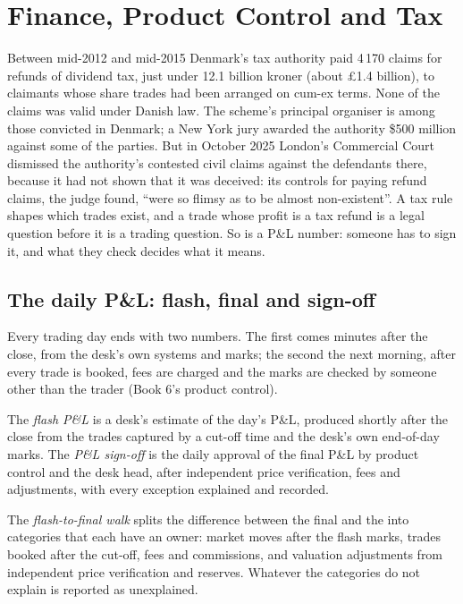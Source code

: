 \chapter{Finance, Product Control and Tax}\label{ch:fm:finance-product-control-and-tax}

Between mid-2012 and mid-2015 Denmark's tax authority paid 4\,170 claims for refunds of dividend tax, just under 12.1 billion kroner (about
\pounds1.4 billion), to claimants whose share trades had been arranged on cum-ex terms. None of the claims was valid under Danish law. The scheme's
principal organiser is among those convicted in Denmark; a New York jury awarded the authority \$500 million against some of the parties. But in
October 2025 London's Commercial Court dismissed the authority's contested civil claims against the defendants there, because it had not shown that it was
deceived: its controls for paying refund claims, the judge found, ``were so flimsy as to be almost non-existent''. A tax rule shapes which trades
exist, and a trade whose profit is a tax refund is a legal question before it is a trading question. So is a P\&L number: someone has to sign it,
and what they check decides what it means.

\section{The daily P\&L: flash, final and sign-off}

Every trading day ends with two numbers. The first comes minutes after the close, from the desk's own systems and marks; the second the next
morning, after every trade is booked, fees are charged and the marks are checked by someone other than the trader (Book 6's product control).

\begin{definition}\label{def:fm:finance-product-control-and-tax:flash}
The \emph{flash P\&L} is a desk's estimate of the day's P\&L, produced shortly after the close from the trades captured by a
cut-off time and the desk's own end-of-day marks. The \emph{P\&L sign-off} is the daily approval of the final P\&L by product
control and the desk head, after independent price verification, fees and adjustments, with every exception explained and recorded.
\end{definition}

\begin{definition}\label{def:fm:finance-product-control-and-tax:walk}
The \emph{flash-to-final walk} splits the difference between the final and the  into categories that each
have an owner: market moves after the flash marks, trades booked after the cut-off, fees and commissions, and valuation adjustments from
independent price verification and reserves. Whatever the categories do not explain is reported as unexplained.
\end{definition}

